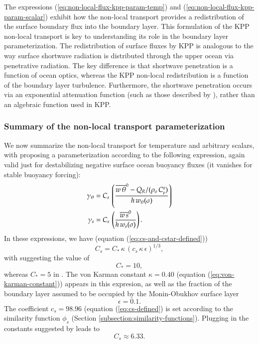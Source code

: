 The expressions (\ref{eq:non-local-flux-kpp-param-temp}) and
(\ref{eq:non-local-flux-kpp-param-scalar}) exhibit how the non-local
transport provides a redistribution of the surface boundary flux into
the boundary layer.  This formulation of the KPP non-local transport
is key to understanding its role in the boundary layer
parameterization.  The redistribution of surface fluxes by KPP is
analogous to the way surface shortwave radiation is distributed
through the upper ocean via penetrative radiation.  The key difference
is that shortwave penetration is a function of ocean optics, whereas
the KPP non-local redistribution is a function of the boundary layer
turbulence.  Furthermore, the shortwave penetration occurs via an
exponential attenuation function (such as those described by
\cite{Manizza_etal2005}), rather than an algebraic function used in
KPP.


\subsubsection{Summary of the non-local transport parameterization} 

We now summarize the non-local transport for temperature and arbitrary
scalars, with \cite{LargeKPP} proposing a parameterization according
to the following expression, again valid just for destabilizing
negative surface ocean buoyancy fluxes (it vanishes for stable
buoyancy forcing):
\begin{align}
 \gamma_{\theta} &= 
   C_{s} \, \left( \frac{ \overline{w \, \theta}^{0} - Q_{R}/(\rho_{o} \, C_{\mbox{\tiny p}}^{o} )  }{h \,  w_{\theta}(\sigma)}  
            \right) 
\label{eq:non-local-temp-kpp-again}
\\
 \gamma_{s} &= 
   C_{s} \, \left( \frac{ \overline{w \, s}^{0} }{h \,  w_{s}(\sigma)}  
            \right).
\label{eq:non-local-scalar-kpp-again}
\end{align}
In these expressions, we have (equation
(\ref{eq:cs-and-cstar-defined}))
\begin{equation}
 C_{s} = C_{*} \, \kappa \, (c_{s} \, \kappa \, \epsilon)^{1/3},  
\end{equation}
with \cite{LargeKPP} suggesting the value of 
\begin{equation}
 C_{*} = 10,
\end{equation}
whereas $C_{*} = 5$ in \cite{Smyth_etal2002}.  The von Karman constant
$\kappa = 0.40$ (equation (\ref{eq:von-karman-constant})) appears in
this expresion, as well as the fraction of the boundary layer assumed
to be occupied by the Monin-Obukhov surface layer
\begin{equation}
\epsilon = 0.1.
\end{equation}
The coefficient $c_{s} = 98.96$ (equation (\ref{eq:cs-defined}) is set
according to the similarity function $\phi_{s}$ (Section
\ref{subsection:similarity-functions}).  Plugging in the constants
suggested by \cite{LargeKPP} leads to
\begin{equation}
 C_{s} \approx 6.33. 
\label{eq:Cs-value}
\end{equation}

